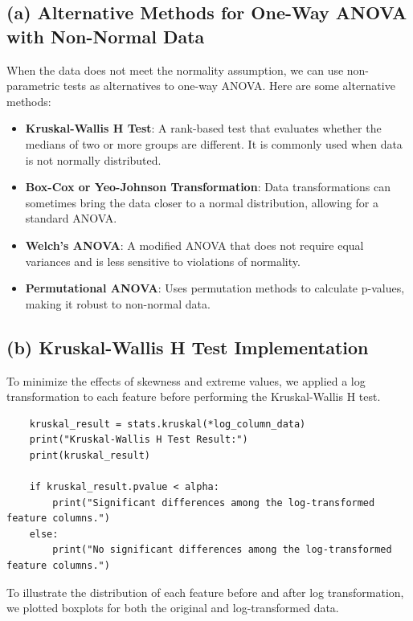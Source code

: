 \documentclass[12pt]{article}
\begin{document}
\subsection*{(a) Alternative Methods for One-Way ANOVA with Non-Normal Data}

When the data does not meet the normality assumption, we can use non-parametric tests as alternatives to one-way ANOVA. Here are some alternative methods:

\begin{itemize}
    \item \textbf{Kruskal-Wallis H Test}: A rank-based test that evaluates whether the medians of two or more groups are different. It is commonly used when data is not normally distributed.
    \item \textbf{Box-Cox or Yeo-Johnson Transformation}:  Data transformations can sometimes bring the data closer to a normal distribution, allowing for a standard ANOVA.
    \item \textbf{Welch’s ANOVA}: A modified ANOVA that does not require equal variances and is less sensitive to violations of normality.
    \item \textbf{Permutational ANOVA}: Uses permutation methods to calculate p-values, making it robust to non-normal data.
\end{itemize}

\subsection*{(b) Kruskal-Wallis H Test Implementation}

To minimize the effects of skewness and extreme values, we applied a log transformation to each feature before performing the Kruskal-Wallis H test. 

\begin{verbatim}
    kruskal_result = stats.kruskal(*log_column_data)
    print("Kruskal-Wallis H Test Result:")
    print(kruskal_result)

    if kruskal_result.pvalue < alpha:
        print("Significant differences among the log-transformed feature columns.")
    else:
        print("No significant differences among the log-transformed feature columns.")

\end{verbatim}

To illustrate the distribution of each feature before and after log transformation, we plotted boxplots for both the original and log-transformed data.
\end{document}
